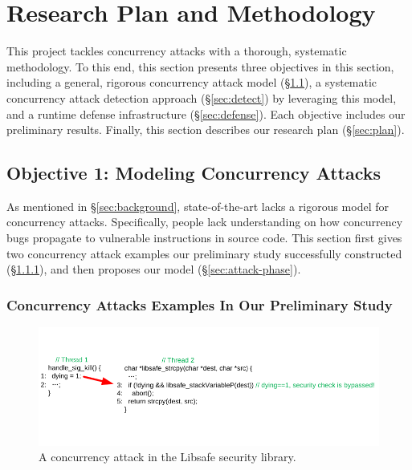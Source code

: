 \section{Research Plan and Methodology} \label{sec:rep}

This \xxx project tackles concurrency attacks with a thorough, systematic 
methodology. To this end, this section presents three objectives in this 
section, including a general, rigorous concurrency attack model 
(\S\ref{sec:model}), a systematic concurrency attack detection approach 
(\S\ref{sec:detect}) by leveraging this model, and a runtime defense 
infrastructure (\S\ref{sec:defense}). Each objective includes our preliminary 
results. Finally, this section describes our research plan (\S\ref{sec:plan}).

\vspace{-.15in}\subsection{Objective 1: Modeling Concurrency Attacks} 
\label{sec:model}\vspace{-.075in}

As mentioned in \S\ref{sec:background}, state-of-the-art lacks a rigorous model 
for concurrency attacks. Specifically, people lack understanding on how 
concurrency bugs propagate to vulnerable instructions in source code. This 
section first gives two concurrency attack examples our preliminary study 
successfully constructed (\S\ref{sec:examples}), and then proposes 
our model (\S\ref{sec:attack-phase}).

\vspace{-.15in}\subsubsection{Concurrency Attacks Examples In Our Preliminary 
Study} 
\label{sec:examples}\vspace{-.075in}

\begin{figure}[h]
\centering
\includegraphics[width=0.8\columnwidth]{figures/libsafe}
\vspace{-.05in}
\caption{{A concurrency attack in the Libsafe security library.}} 
\label{fig:libsafe}
\vspace{-.15in}
\end{figure}


